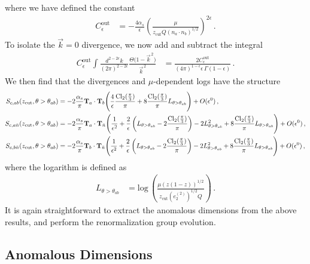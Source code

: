 \documentclass[a4paper,11pt]{article}
\newcommand{\nbar}{{\bar n}}
\newcommand{\ecf}[2]{e_{#1}^{(#2)}}
\def\log{\text{log}}
\newcommand{\nn}{\nonumber}
\def\zcut{z_{\text{cut}}}
\def\nbar{\bar n}
\begin{document}
where we have defined the constant
\begin{align}
C_{\epsilon}^{\text{out}}&=-\frac{4\alpha_s}{\epsilon}\left(\frac{\mu}{\zcut Q(n_a\cdot n_b)^{1/2}}\right)^{2\epsilon}\,.
\end{align}
To isolate the $\vec{k}=0$ divergence, we now add and subtract the integral
\begin{align}\label{eq:collinear_soft_subtraction2}
C_{\epsilon}^{\text{out}}\int\frac{d^{2-2\epsilon}{k}}{(2\pi)^{2-2\epsilon}}\frac{\Theta\Big(1-\vec{k}^{\,2}\Big)}{\vec{k}^{\,2}}&=\frac{2C_{\epsilon}^{\text{out}}}{(4\pi)^{1-\epsilon}\epsilon\,\Gamma(1-\epsilon)}\,.
\end{align}
We then find that the divergences and $\mu$-dependent logs have the structure
{\small\begin{align}
S_{c, ab}(\zcut,\theta>\theta_{ab}) &= -2\frac{\alpha_s}{\pi}{\bf T}_a\cdot {\bf T}_b\Bigg(\frac{4}{\epsilon}\frac{\text{Cl}_2(\frac{\pi}{3})}{\pi}+8\frac{\text{Cl}_2(\frac{\pi}{3})}{\pi}L_{\theta>\theta_{ab}}\Bigg)+O(\epsilon^0) \,,\\
S_{c, a\nbar}(\zcut,\theta>\theta_{ab}) &= -2\frac{\alpha_s}{\pi}{\bf T}_a\cdot {\bf T}_{\nbar}\Bigg(\frac{1}{\epsilon^2}+\frac{2}{\epsilon}\left(L_{\theta>\theta_{ab}}-2\frac{\text{Cl}_2(\frac{\pi}{3})}{\pi}\right)-2L_{\theta>\theta_{ab}}^2+8\frac{\text{Cl}_2(\frac{\pi}{3})}{\pi}L_{\theta>\theta_{ab}}\Bigg)+O(\epsilon^0)\,,\nonumber\\
S_{c, b\nbar}(\zcut,\theta>\theta_{ab}) &= -2\frac{\alpha_s}{\pi}{\bf T}_b\cdot {\bf T}_{\nbar}\Bigg(\frac{1}{\epsilon^2}+\frac{2}{\epsilon}\left(L_{\theta>\theta_{ab}}-2\frac{\text{Cl}_2(\frac{\pi}{3})}{\pi}\right)-2L_{\theta>\theta_{ab}}^2+8\frac{\text{Cl}_2(\frac{\pi}{3})}{\pi}L_{\theta>\theta_{ab}}\Bigg)+O(\epsilon^0)\,, \nn
\end{align}}
where the logarithm is defined as
{\small\begin{align}
L_{\theta>\theta_{ab}}&=\log\,\left(\frac{\mu(z(1-z))^{1/2}}{\zcut\left(\ecf{2}{2}\right)^{1/2}Q}\right)\,.
\end{align}}
It is again straightforward to extract the anomalous dimensions from the above results, and perform the renormalization group evolution.

\subsection{Anomalous Dimensions}\label{app:anom_dim}
\end{document}
